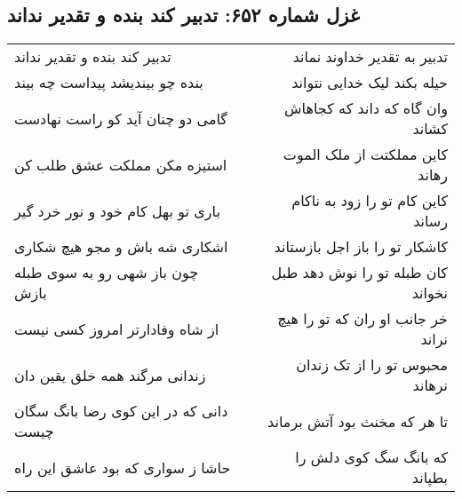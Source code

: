 \begin{center}
\section*{غزل شماره ۶۵۲: تدبیر کند بنده و تقدیر نداند}
\label{sec:0652}
\begin{longtable}{l p{0.5cm} r}
تدبیر کند بنده و تقدیر نداند
&&
تدبیر به تقدیر خداوند نماند
\\
بنده چو بیندیشد پیداست چه بیند
&&
حیله بکند لیک خدایی نتواند
\\
گامی دو چنان آید کو راست نهادست
&&
وان گاه که داند که کجاهاش کشاند
\\
استیزه مکن مملکت عشق طلب کن
&&
کاین مملکتت از ملک الموت رهاند
\\
باری تو بهل کام خود و نور خرد گیر
&&
کاین کام تو را زود به ناکام رساند
\\
اشکاری شه باش و مجو هیچ شکاری
&&
کاشکار تو را باز اجل بازستاند
\\
چون باز شهی رو به سوی طبله بازش
&&
کان طبله تو را نوش دهد طبل نخواند
\\
از شاه وفادارتر امروز کسی نیست
&&
خر جانب او ران که تو را هیچ نراند
\\
زندانی مرگند همه خلق یقین دان
&&
محبوس تو را از تک زندان نرهاند
\\
دانی که در این کوی رضا بانگ سگان چیست
&&
تا هر که مخنث بود آتش برماند
\\
حاشا ز سواری که بود عاشق این راه
&&
که بانگ سگ کوی دلش را بطپاند
\\
\end{longtable}
\end{center}
